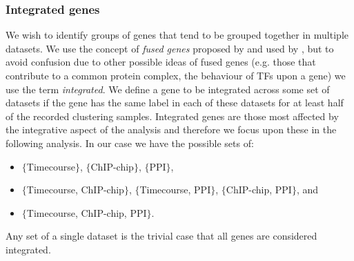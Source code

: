 \documentclass[]{article}
\begin{document}
%




\subsubsection{Integrated genes}
We wish to identify groups of genes that tend to be grouped together in multiple datasets. We use the concept of \emph{fused genes} proposed by \cite{savage2010discovering} and used by \cite{kirk2012bayesian}, but to avoid confusion due to other possible ideas of fused genes (e.g. those that contribute to a common protein complex, the behaviour of TFs upon a gene) we use the term \emph{integrated}. We define a gene to be integrated across some set of datasets if the gene has the same label in each of these datasets for at least half of the recorded clustering samples. Integrated genes are those most affected by the integrative aspect of the analysis and therefore we focus upon these in the following analysis. In our case we have the possible sets of:
\begin{itemize}
	\item $\{$Timecourse$\}$, $\{$ChIP-chip$\}$, $\{$PPI$\}$,
	\item $\{$Timecourse, ChIP-chip$\}$, $\{$Timecourse, PPI$\}$, $\{$ChIP-chip, PPI$\}$, and
	\item $\{$Timecourse, ChIP-chip, PPI$\}$.
\end{itemize}
Any set of a single dataset is the trivial case that all genes are considered integrated.
\end{document}
